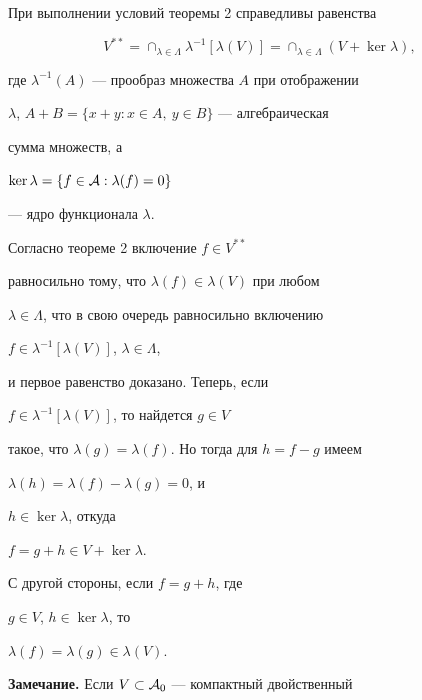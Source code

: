 \begin{cor}


При выполнении условий теоремы 2 справедливы равенства 


$$


V^{**} = \cap_{\lambda \in \Lambda} \lambda^{-1} [\lambda(V)]= 


\cap_{\lambda \in \Lambda} (V + \ker\lambda),


$$


где $\lambda^{-1}(A)$ --- прообраз множества $A$ при отображении 


$\lambda$, $A+B= \{ x+y: x\in A,\ y\in B \}$ --- алгебраическая 


сумма множеств, а 


$\ker\lambda= \{ f\in {\cal A}: \lambda(f)=0 \}$ 


--- ядро функционала $\lambda$. 


\end{cor}





\begin{pf}


Согласно теореме 2 включение $f\in V^{**}$ 


равносильно тому, что $\lambda(f)\in \lambda(V)$ при любом 


$\lambda \in \Lambda$, что в свою очередь равносильно включению 


$f\in \lambda^{-1} [\lambda(V)]$, $\lambda \in \Lambda$, 


и первое равенство доказано. Теперь, если 


$f\in \lambda^{-1} [\lambda(V)]$, то найдется $g\in V$ 


такое, что $\lambda(g)= \lambda(f)$. Но тогда для $h=f-g$ имеем 


$\lambda(h)= \lambda(f)- \lambda(g) =0$, и 


$h\in \ker\lambda$, откуда 


$f= g+h \in V + \ker\lambda$. 


С другой стороны, если $f=g+h$, где 


$g\in V$, $h\in \ker\lambda$, то 


$\lambda(f)=\lambda(g)\in \lambda(V)$.


\end{pf}





{\bf Замечание.} Если $V \subset {\cal A}_0$ --- компактный двойственный



